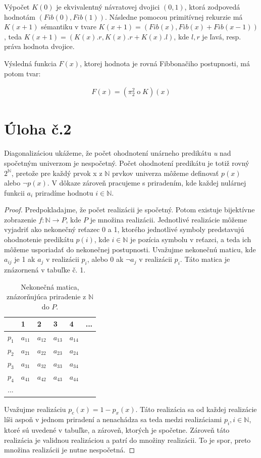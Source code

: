 \documentclass[10pt]{article}
\begin{document}
Výpočet $K(0)$ je ekvivalentný návratovej dvojici $(0,1)$, ktorá zodpovedá hodnotám $(Fib(0), Fib(1))$. 
Následne pomocou primitívnej rekurzie má $K(x+1)$ sémantiku v tvare $K(x+1) = (Fib(x), Fib(x) + Fib(x-1))$, teda
$K(x+1) = (K(x).r, K(x).r + K(x).l)$, kde $l,r$ je ľavá, resp. práva hodnota dvojice.

Výsledná funkcia $F(x)$, ktorej hodnota je rovná Fibbonačiho postupnosti, má potom tvar:

\begin{align*}
    F(x) = (\pi_2^2 \mathbin{o} K) (x)
\end{align*}

\section*{Úloha č.2}
Diagonalizáciou ukážeme, že počet ohodnotení unárneho predikátu \textit{u} nad spočetným univerzom je nespočetný. Počet ohodnotení predikátu je totiž rovný $2^{\mathbb{N}}$, pretože pre každý prvok x z $\mathbb{N}$ prvkov univerza môžeme definovať $p(x)$ alebo $\neg p(x)$.
V dôkaze zároveň pracujeme s priradením, kde každej nulárnej funkcii $a_i$ priradíme hodnotu $i \in \mathbb{N}$.

\begin{proof}
    Predpokladajme, že počet realizácii je spočetný. Potom existuje bijektívne zobrazenie $f: \mathbb{N} \to P$, kde $P$ je množina realizácii.
    Jednotlivé realizácie môžeme vyjadriť ako nekonečný reťazec 0 a 1, ktorého jednotlivé symboly predstavujú ohodnotenie predikátu $p(i)$, kde $i \in \mathbb{N}$ je pozícia symbolu v reťazci, a teda ich môžeme usporiadať do nekonečnej postupnosti.
    Uvažujme nekonečnú maticu, kde $a_{ij}$ je 1 ak $a_j$ v realizácii $p_i$, alebo 0 ak $\neg a_j$ v realizácii $p_i$. Táto matica je znázornená v tabuľke č. 1.
\begin{table}[ht]
\begin{tabular}{l| lllll}
    & 1   & 2   & 3    & 4  & ... \\ \hline 
    $p_1$  & $a_{11}$ & $a_{12}$ & $a_{13}$  & $a_{14}$ &     \\
    $p_2$  & $a_{21}$ & $a_{22}$ & $a_{23}$  & $a_{24}$ &     \\
    $p_3$  & $a_{31}$ & $a_{32}$ & $a_{33}$  & $a_{34}$ &     \\
    $p_4$  & $a_{41}$ & $a_{42}$ & $a_{43}$  & $a_{44}$ &     \\
... &     &   &   &   &
\end{tabular}
    \caption{Nekonečná matica, znázorňujúca priradenie z $\mathbb{N}$ do $P$.}
\end{table}

Uvažujme realizáciu $p_c(x) = 1 - p_x(x)$. Táto realizácia sa od každej realizácie líši
    aspoň v jednom priradení a nenachádza sa teda medzi realizáciami $p_i, i \in \mathbb{N}$, ktoré sú uvedené v tabuľke, a zároveň, ktorých je spočetne. Zároveň táto realizácia je validnou realizáciou a patrí do množiny realizácii. To je spor, preto množina realizácii je nutne nespočetná. 
\end{proof}
\end{document}
